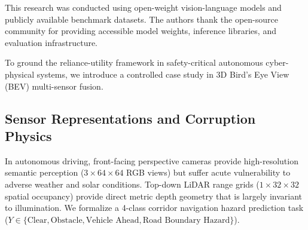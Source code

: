 \documentclass[graybox]{svmult}
\begin{document}
\begin{acknowledgement}
This research was conducted using open-weight vision-language models and publicly available benchmark datasets. The authors thank the open-source community for providing accessible model weights, inference libraries, and evaluation infrastructure.
\end{acknowledgement}

\label{sec:bev}

To ground the reliance-utility framework in safety-critical autonomous cyber-physical systems, we introduce a controlled case study in 3D Bird's Eye View (BEV) multi-sensor fusion. 

\subsection{Sensor Representations and Corruption Physics}
In autonomous driving, front-facing perspective cameras provide high-resolution semantic perception ($3 \times 64 \times 64$ RGB views) but suffer acute vulnerability to adverse weather and solar conditions. Top-down LiDAR range grids ($1 \times 32 \times 32$ spatial occupancy) provide direct metric depth geometry that is largely invariant to illumination. We formalize a 4-class corridor navigation hazard prediction task ($Y \in \{\text{Clear}, \text{Obstacle}, \text{Vehicle Ahead}, \text{Road Boundary Hazard}\}$).
\end{document}
